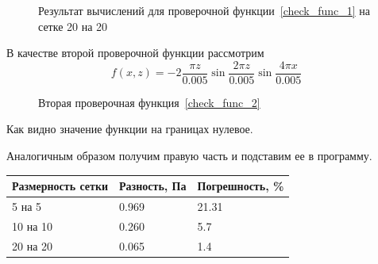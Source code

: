 \documentclass[a4paper,14pt]{extarticle}
\begin{document}
\begin{figure}[!htbp]
	\caption{Результат вычислений для проверочной функции~\eqref{check_func_1} на сетке 20 на 20}
	\label{res_check_func_1}
\end{figure}


В качестве второй проверочной функции рассмотрим
\begin{equation}
	f(x, z) = -2 \frac{\pi z}{0.005} \sin{\frac{2 \pi z}{0.005}} \sin{\frac{4 \pi x}{0.005}}
	\label{check_func_2}
\end{equation}
\begin{figure}[!htbp]
	\caption{Вторая проверочная функция~\eqref{check_func_2}}
	\label{check_func_2_pic}
\end{figure}
Как видно значение функции на границах нулевое.

Аналогичным образом получим правую часть и подставим ее в программу.

\begin{table}[!htbp]
	\begin{tabular}{|l|l|l|}
		\hline
		\multicolumn{1}{|c|}{Размерность сетки} & \multicolumn{1}{c|}{Разность, Па} & Погрешность, \% \\ \hline
		5 на 5                                  & 0.969                              & 21.31            \\ \hline
		10 на 10                                & 0.260                              & 5.7            \\ \hline
		20 на 20                                & 0.065                              & 1.4            \\ \hline
	\end{tabular}
\end{table}
\end{document}
